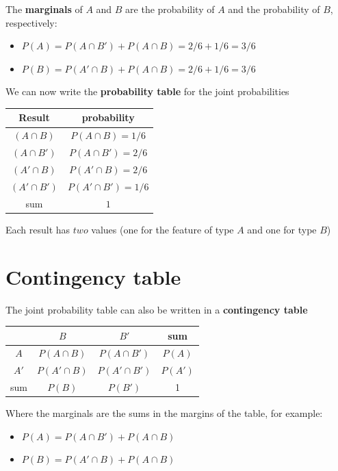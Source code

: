 \documentclass[
]{book}
\providecommand{\tightlist}{%
  \setlength{\itemsep}{0pt}\setlength{\parskip}{0pt}}
\begin{document}
The \textbf{marginals} of \(A\) and \(B\) are the probability of \(A\) and the probability of \(B\), respectively:

\begin{itemize}
\tightlist
\item
  \(P(A)=P(A\cap B') + P(A \cap B)=2/6+1/6=3/6\)
\item
  \(P(B)=P(A'\cap B) +P(A \cap B)=2/6+1/6=3/6\)
\end{itemize}

We can now write the \textbf{probability table} for the joint probabilities

\begin{longtable}[]{@{}cc@{}}
\toprule\noalign{}
Result & probability \\
\midrule\noalign{}
\endhead
\bottomrule\noalign{}
\endlastfoot
\((A\cap B)\) & \(P(A \cap B)=1/6\) \\
\((A\cap B')\) & \(P(A \cap B')=2/6\) \\
\((A'\cap B)\) & \(P(A' \cap B)=2/6\) \\
\((A'\cap B')\) & \(P(A' \cap B')=1/6\) \\
sum & \(1\) \\
\end{longtable}

Each result has \(two\) values (one for the feature of type \(A\) and one for type \(B\))

\hypertarget{contingency-table}{%
\section{Contingency table}\label{contingency-table}}

The joint probability table can also be written in a \textbf{contingency table}

\begin{longtable}[]{@{}cccc@{}}
\toprule\noalign{}
& \(B\) & \(B'\) & sum \\
\midrule\noalign{}
\endhead
\bottomrule\noalign{}
\endlastfoot
\(A\) & \(P(A \cap B )\) & \(P(A\cap B' )\) & \(P(A)\) \\
\(A'\) & \(P(A'\cap B )\) & \(P(A'\cap B' )\) & \(P(A')\) \\
sum & \(P(B)\) & \(P(B')\) & 1 \\
\end{longtable}

Where the marginals are the sums in the margins of the table, for example:

\begin{itemize}
\tightlist
\item
  \(P(A)=P(A \cap B') + P(A \cap B)\)
\item
  \(P(B)=P(A' \cap B) + P(A \cap B)\)
\end{itemize}
\end{document}
